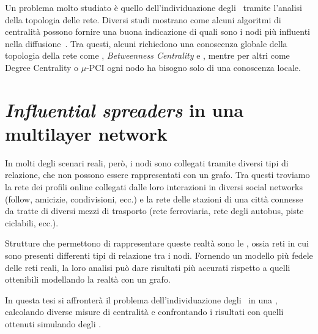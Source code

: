 Un problema molto studiato è quello dell'individuazione degli \infsp\ tramite l'analisi della 
topologia delle rete.
Diversi studi mostrano come alcuni algoritmi di centralità possono fornire una buona indicazione di 
quali sono i nodi più influenti nella diffusione~\cite{kitsak:infsp}\cite{basaras:infsp}\cite{pei:infsp}.
Tra questi, alcuni richiedono una conoscenza globale della topologia della rete come
\PageRank, \textit{Betweenness Centrality} e \kcore, 
mentre per altri come Degree Centrality o $\mu$-PCI ogni nodo 
ha bisogno solo di una conoscenza locale.

\section{\textit{Influential spreaders} in una multilayer network}

In molti degli scenari reali, però, i nodi sono collegati tramite diversi tipi di relazione, che non 
possono essere rappresentati con un grafo. 
Tra questi troviamo la rete dei profili online collegati dalle loro interazioni
in diversi social networks (follow, amicizie, condivisioni, ecc.) e la rete delle stazioni di 
una città connesse da tratte di diversi mezzi di trasporto (rete ferroviaria, rete degli autobus, 
piste ciclabili, ecc.).

Strutture che permettono di rappresentare queste realtà sono le \mulns, ossia reti in cui sono 
presenti differenti tipi di relazione tra i nodi. Fornendo un modello più fedele 
delle reti reali, la loro analisi può dare risultati più accurati rispetto 
a quelli ottenibili modellando la realtà con un grafo.

In questa tesi si affronterà il problema dell'individuazione degli \infsp\ in 
una \muln, calcolando diverse misure di centralità e confrontando i 
risultati con quelli ottenuti simulando degli \spprocs.
